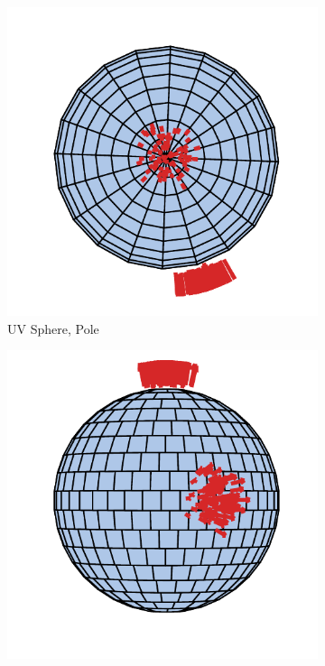 \begin{figure}[H]
\begin{subfigure}[t]{.23\linewidth}
    \centering\includegraphics[width=.95\linewidth]{chapter_3_polylidar3d/imgs/ref_ga/uv_sphere_2.pdf}
    \caption{UV Sphere, Pole\label{fig:ch3_bg_ga_b}}
  \end{subfigure}
  \begin{subfigure}[t]{.23\linewidth}
    \centering\includegraphics[width=.95\linewidth]{chapter_3_polylidar3d/imgs/ref_ga/strips_sphere_1.pdf}

\end{subfigure}
\end{figure}
